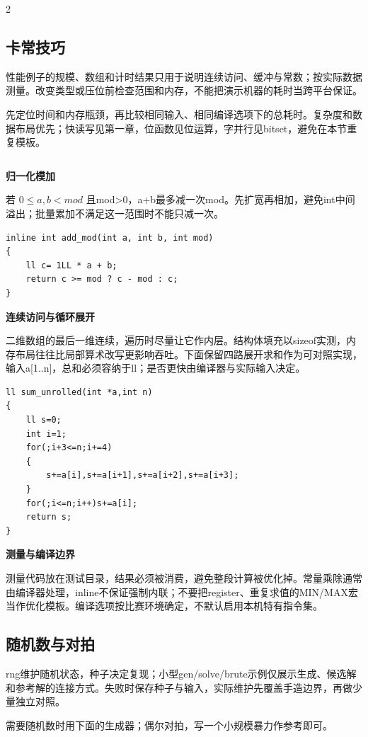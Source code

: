 \documentclass[UTF8,fontset=fandol,a4paper,twoside]{ctexart}
\newcommand{\topic}[1]{\par\smallskip\textbf{#1}\par\nobreak}
\newcommand{\note}[1]{{\fontsize{10}{12}\selectfont #1\par}}
\begin{document}
\begin{multicols}{2}
\subsection{卡常技巧}

\note{性能例子的规模、数组和计时结果只用于说明连续访问、缓冲与常数；按实际数据测量。改变类型或压位前检查范围和内存，不能把演示机器的耗时当跨平台保证。}
\note{先定位时间和内存瓶颈，再比较相同输入、相同编译选项下的总耗时。复杂度和数据布局优先；快读写见第一章，位函数见位运算，字并行见bitset，避免在本节重复模板。}
\begin{lstlisting}

\end{lstlisting}
\topic{归一化模加}
\note{若 $0\le a,b<mod$ 且mod>\allowbreak{}0，a+\allowbreak{}b最多减一次mod。先扩宽再相加，避免int中间溢出；批量累加不满足这一范围时不能只减一次。}
\begin{lstlisting}
inline int add_mod(int a, int b, int mod)
{
    ll c= 1LL * a + b;
    return c >= mod ? c - mod : c;
}
\end{lstlisting}
\topic{连续访问与循环展开}
\note{二维数组的最后一维连续，遍历时尽量让它作内层。结构体填充以sizeof实测，内存布局往往比局部算术改写更影响吞吐。下面保留四路展开求和作为可对照实现，输入a[\allowbreak{}1.\allowbreak{}.\allowbreak{}n]\allowbreak{}，总和必须容纳于ll；是否更快由编译器与实际输入决定。}
\begin{lstlisting}
ll sum_unrolled(int *a,int n)
{
    ll s=0;
    int i=1;
    for(;i+3<=n;i+=4)
    {
        s+=a[i],s+=a[i+1],s+=a[i+2],s+=a[i+3];
    }
    for(;i<=n;i++)s+=a[i];
    return s;
}
\end{lstlisting}
\topic{测量与编译边界}
\note{测量代码放在测试目录，结果必须被消费，避免整段计算被优化掉。常量乘除通常由编译器处理，inline不保证强制内联；不要把register、重复求值的MIN/\allowbreak{}MAX宏当作优化模板。编译选项按比赛环境确定，不默认启用本机特有指令集。}
\subsection{随机数与对拍}

\note{rng维护随机状态，种子决定复现；小型gen/\allowbreak{}solve/\allowbreak{}brute示例仅展示生成、候选解和参考解的连接方式。失败时保存种子与输入，实际维护先覆盖手造边界，再做少量独立对照。}
\note{需要随机数时用下面的生成器；偶尔对拍，写一个小规模暴力作参考即可。}
\begin{lstlisting}


\end{lstlisting}
\end{multicols}
\end{document}
